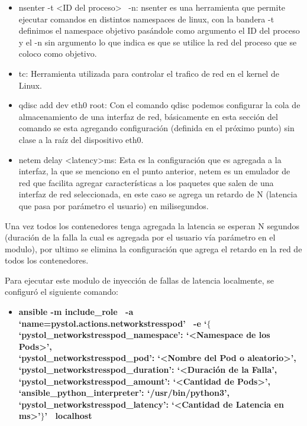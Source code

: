 \begin{itemize}
        \item nsenter -t <ID del proceso> \ -n: nsenter es una herramienta que permite ejecutar comandos en distintos namespaces de linux, con la bandera -t definimos el namespace objetivo pasándole como argumento el ID del proceso y el -n sin argumento lo que indica es que se utilice la red del proceso que se coloco como objetivo.
        \item tc: Herramienta utilizada para controlar el trafico de red en el kernel de Linux.
        \item qdisc add dev eth0 root: Con el comando qdisc podemos configurar la cola de almacenamiento de una interfaz de red, básicamente en esta sección del comando se esta agregando configuración (definida en el próximo punto) sin clase a la raíz del dispositivo eth0.
        \item netem delay <latency>ms: Esta es la configuración que es agregada a la interfaz, la que se menciono en el punto anterior, netem es un emulador de red que facilita agregar características a los paquetes que salen de una interfaz de red seleccionada, en este caso se agrega un retardo de N (latencia que pasa por parámetro el usuario) en milisegundos.\\
    \end{itemize}
    
\par Una vez todos los contenedores tenga agregada la latencia se esperan N segundos (duración de la falla la cual es agregada por el usuario vía parámetro en el modulo), por ultimo se elimina la configuración que agrega el retardo en la red de todos los contenedores.\\ 

\par Para ejecutar este modulo de inyección de fallas de latencia localmente, se configur\'o el siguiente comando:
\begin{itemize}
    \item \textbf{ansible -m include\_role \ -a `name=pystol.actions.networkstresspod' \ -e `$\{$ \\
    `pystol\_networkstresspod\_namespace': `<Namespace de los Pods>', \\
    `pystol\_networkstresspod\_pod': `<Nombre del Pod o aleatorio>', \\
    `pystol\_networkstresspod\_duration': `<Duración de la Falla', \\
    `pystol\_networkstresspod\_amount': `<Cantidad de Pods>', \\
    `ansible\_python\_interpreter': `/usr/bin/python3', \\
    `pystol\_networkstresspod\_latency': `<Cantidad de Latencia en ms>'$\}$' \ localhost} %
\end{itemize}

